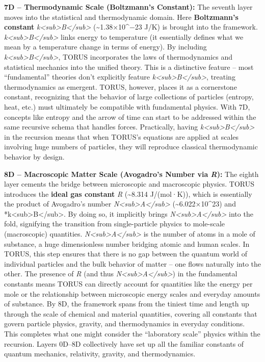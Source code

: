 \documentclass[
]{article}
\begin{document}
\textbf{7D -- Thermodynamic Scale (Boltzmann's Constant):} The seventh
layer moves into the statistical and thermodynamic domain. Here
\textbf{Boltzmann's constant}
\emph{k\textless sub\textgreater B\textless/sub\textgreater{}}
(\textasciitilde1.38×10\^{}−23 J/K) is brought into the framework.
\emph{k\textless sub\textgreater B\textless/sub\textgreater{}} links
energy to temperature (it essentially defines what we mean by a
temperature change in terms of energy). By including
\emph{k\textless sub\textgreater B\textless/sub\textgreater{}}, TORUS
incorporates the laws of thermodynamics and statistical mechanics into
the unified theory. This is a distinctive feature -- most
``fundamental'' theories don't explicitly feature
\emph{k\textless sub\textgreater B\textless/sub\textgreater{}}, treating
thermodynamics as emergent. TORUS, however, places it as a cornerstone
constant, recognizing that the behavior of large collections of
particles (entropy, heat, etc.) must ultimately be compatible with
fundamental physics. With 7D, concepts like entropy and the arrow of
time can start to be addressed within the same recursive schema that
handles forces. Practically, having
\emph{k\textless sub\textgreater B\textless/sub\textgreater{}} in the
recursion means that when TORUS's equations are applied at scales
involving huge numbers of particles, they will reproduce classical
thermodynamic behavior by design.

\textbf{8D -- Macroscopic Matter Scale (Avogadro's Number via
\emph{R}):} The eighth layer cements the bridge between microscopic and
macroscopic physics. TORUS introduces the \textbf{ideal gas constant}
\emph{R} (\textasciitilde8.314 J/(mol·K)), which is essentially the
product of Avogadro's number
\emph{N\textless sub\textgreater A\textless/sub\textgreater{}}
(\textasciitilde6.022×10\^{}23) and
*k\textless sub\textgreater B\textless/sub\textgreater. By doing so, it
implicitly brings
\emph{N\textless sub\textgreater A\textless/sub\textgreater{}} into the
fold, signifying the transition from single-particle physics to
mole-scale (macroscopic) quantities.
\emph{N\textless sub\textgreater A\textless/sub\textgreater{}} is the
number of atoms in a mole of substance, a huge dimensionless number
bridging atomic and human scales. In TORUS, this step ensures that there
is no gap between the quantum world of individual particles and the bulk
behavior of matter -- one flows naturally into the other. The presence
of \emph{R} (and thus
\emph{N\textless sub\textgreater A\textless/sub\textgreater{}}) in the
fundamental constants means TORUS can directly account for quantities
like the energy per mole or the relationship between microscopic energy
scales and everyday amounts of substance. By 8D, the framework spans
from the tiniest time and length up through the scale of chemical and
material quantities, covering all constants that govern particle
physics, gravity, and thermodynamics in everyday conditions. This
completes what one might consider the ``laboratory scale'' physics
within the recursion. Layers 0D--8D collectively have set up all the
familiar constants of quantum mechanics, relativity, gravity, and
thermodynamics.
\end{document}
